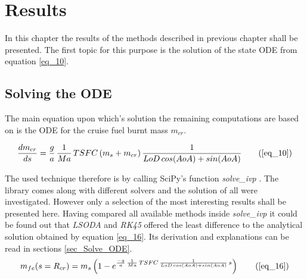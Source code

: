 
\chapter{Results}
\label{chap_Results}

In this chapter the results of the methods described 
in previous chapter shall be presented. The first 
topic for this purpose is the solution of 
the state ODE from equation \eqref{eq_10}.


\section{Solving the ODE}
\label{sec_Solve_ODE_Methods}

The main equation upon which's solution 
the remaining computations are based on 
is the ODE for the cruise 
fuel burnt mass $m_{cr}$.

\begin{equation}
    \frac{dm_{cr}}{ds} = \frac{g}{a} \, \frac{1}{Ma}\,TSFC \,(m_s + m_{cr})
    \, \frac{1}{
    LoD \, cos(AoA) + sin(AoA)}   \tag{\ref{eq_10}}
\end{equation}

The used technique therefore is by calling 
SciPy's function \emph{solve\_ivp} \cite{noauthor_scipys_2021}.
The library comes along with different solvers and the solution 
of all were investigated. However 
only a selection of the most interesting 
results  
shall be presented here. Having compared all 
available methods inside \emph{solve\_ivp} 
it could be found out that \emph{LSODA} and 
\emph{RK45} offered the least difference 
to the analytical solution obtained by equation 
\eqref{eq_16}. Its 
derivation and explanations can be 
read in sections \ref{sec_Solve_ODE}.
\begin{equation}
    m_{fe}(s = R_{cr}) =m_s \left(1-e^{\frac{-g}{a} \, 
    \frac{1}{Ma} \, TSFC \, 
    \frac{1}{LoD \,cos(AoA) + sin(AoA)} \, s} \right)
    \tag{\ref{eq_16}}
\end{equation}

